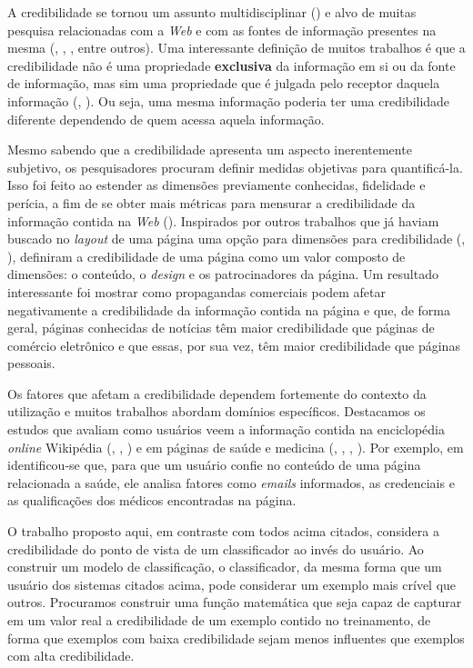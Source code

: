A credibilidade se tornou um assunto multidisciplinar (\cite{Rieh07}) e alvo de muitas pesquisa relacionadas com a \textit{Web} e com as fontes de informação presentes na mesma (\cite{Sundar99}, \cite{Freeman04}, \cite{Flanagin07}, entre outros).
Uma interessante definição de muitos trabalhos é que a credibilidade não é uma propriedade \textbf{exclusiva} da informação em si ou da fonte de informação, mas sim uma propriedade que é julgada pelo receptor daquela informação (\cite{Sundar99}, \cite{Freeman04}). Ou seja, uma mesma informação poderia ter uma credibilidade diferente dependendo de quem acessa aquela informação.

Mesmo sabendo que a credibilidade apresenta um aspecto inerentemente subjetivo, os pesquisadores procuram definir medidas objetivas para quantificá-la. Isso foi feito ao estender as dimensões previamente conhecidas, fidelidade e perícia, a fim de se obter mais métricas para mensurar a credibilidade da informação contida na \textit{Web} (\cite{Flanagin07}). 
Inspirados por outros trabalhos que já haviam buscado no \textit{layout} de uma página uma opção para dimensões para credibilidade
 (\cite{Palmer00}, \cite{Fogg01}), \cite{Flanagin07} definiram a credibilidade de uma página como um valor composto de dimensões: o conteúdo, o \textit{design} e os patrocinadores da página. Um resultado interessante foi mostrar como propagandas comerciais podem afetar negativamente a credibilidade da informação contida na página e que, de forma geral, páginas conhecidas de notícias têm maior credibilidade que páginas de comércio eletrônico e que essas, por sua vez, têm maior credibilidade que páginas pessoais.

Os fatores que afetam a credibilidade dependem fortemente do contexto da utilização e muitos trabalhos abordam domínios específicos.
Destacamos os estudos que avaliam como usuários veem a informação contida na enciclopédia \textit{online} Wikipédia (\cite{Chesney06}, \cite{Lopes08}, \cite{Kubiszewski11}) e em páginas de saúde e medicina (\cite{Linderg98}, \cite{Eastin01}, \cite{Eysenbach02}, \cite{Rains09}). Por exemplo, em \cite{Eysenbach02} 
identificou-se que, para que um usuário confie no conteúdo de uma página relacionada a saúde, ele analisa fatores como \textit{emails} informados, as credenciais e as qualificações dos médicos encontradas na página.

O trabalho proposto aqui, em contraste com todos acima citados, considera a credibilidade do ponto de vista de um classificador ao invés do usuário. Ao construir um modelo de classificação, o classificador, da mesma forma que um usuário dos sistemas citados acima, pode considerar um exemplo mais crível que outros. Procuramos construir uma função matemática que seja capaz de capturar em um valor real a credibilidade de um exemplo contido no treinamento, de forma que exemplos com baixa credibilidade sejam menos influentes que exemplos com alta credibilidade.

